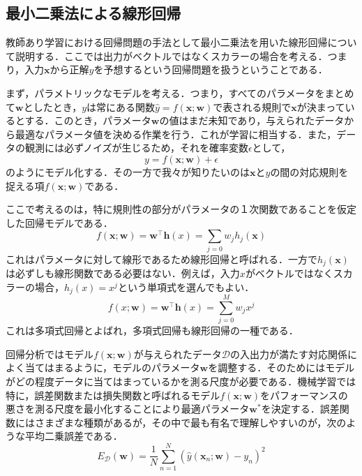 \documentclass[a4paper,11pt]{jsreport}
\begin{document}
\subsection{最小二乗法による線形回帰}
教師あり学習における回帰問題の手法として最小二乗法を用いた線形回帰について説明する．ここでは出力がベクトルではなくスカラーの場合を考える．つまり，入力$\bm{x}$から正解$y$を予想するという回帰問題を扱うということである．\par
まず，パラメトリックなモデルを考える．つまり，すべてのパラメータをまとめて$\bm{w}$としたとき，$y$は常にある関数$\hat{y} = f(\bm{x}; \bm{w})$で表される規則で$\bm{x}$が決まっているとする．このとき，パラメータ$\bm{w}$の値はまだ未知であり，与えられたデータから最適なパラメータ値を決める作業を行う．これが学習に相当する．また，データの観測には必ずノイズが生じるため，それを確率変数$\epsilon$として，
\begin{equation}
  y = f(\bm{x}; \bm{w}) + \epsilon
\end{equation}
のようにモデル化する．その一方で我々が知りたいのは$\bm{x}$と$y$の間の対応規則を捉える項$f(\bm{x}; \bm{w})$である．\par
ここで考えるのは，特に規則性の部分がパラメータの１次関数であることを仮定した回帰モデルである．
\begin{equation}
  f(\bm{x}; \bm{w})
  = \bm{w}^{\top} \bm{h}(x) 
  = \sum_{j=0} w_j h_j(\bm{x})
\end{equation}
これはパラメータに対して線形であるため線形回帰と呼ばれる．一方で$h_j(\bm{x})$は必ずしも線形関数である必要はない．例えば，入力$x$がベクトルではなくスカラーの場合，$h_j(x) = x^j$という単項式を選んでもよい．
\begin{equation}
  f(x; \bm{w}) = \bm{w}^{\top} \bm{h}(x) = \sum_{j=0}^M w_j x^j
\end{equation}
これは多項式回帰とよばれ，多項式回帰も線形回帰の一種である．\par
回帰分析ではモデル$f(\bm{x}; \bm{w})$が与えられたデータ$\mathcal{D}$の入出力が満たす対応関係によく当てはまるように，モデルのパラメータ$\bm{w}$を調整する．そのためにはモデルがどの程度データに当てはまっているかを測る尺度が必要である．機械学習では特に，誤差関数または損失関数と呼ばれるモデル$f(\bm{x}; \bm{w})$をパフォーマンスの悪さを測る尺度を最小化することにより最適パラメータ$\bm{w}^*$を決定する．誤差関数にはさまざまな種類があるが，その中で最も有名で理解しやすいのが，次のような平均二乗誤差である．
\begin{equation}
  E_{\mathcal{D}}(\bm{w})
  = \frac{1}{N} \sum_{n=1}^{N}(\hat{y}(\bm{x}_n; \bm{w}) - y_n)^2
\end{equation}
\end{document}
